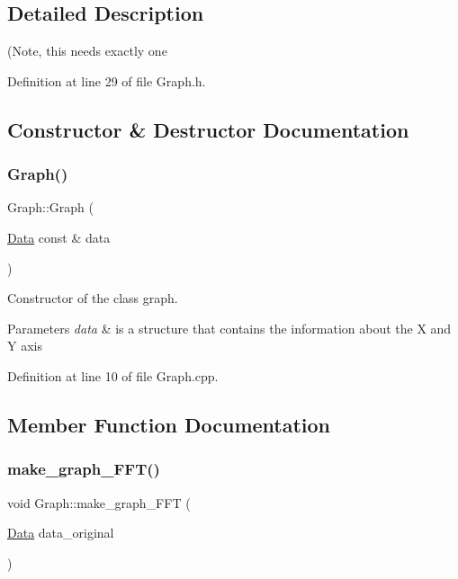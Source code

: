 \subsection{Detailed Description}
(Note, this needs exactly one 

Definition at line 29 of file Graph.\+h.



\subsection{Constructor \& Destructor Documentation}
\mbox{\label{class_graph_ac2cc4f7971589f9674f4fbf3b7dc200c}} 
\subsubsection{\texorpdfstring{Graph()}{Graph()}}
{\footnotesize\ttfamily Graph\+::\+Graph (\begin{DoxyParamCaption}\item[{\mbox{\hyperlink{struct_data}{Data}} const \&}]{data }\end{DoxyParamCaption})\hspace{0.3cm}{\ttfamily [explicit]}}



Constructor of the class graph. 


\begin{DoxyParams}{Parameters}
{\em data} & is a structure that contains the information about the X and Y axis \\
\hline
\end{DoxyParams}


Definition at line 10 of file Graph.\+cpp.



\subsection{Member Function Documentation}
\mbox{\label{class_graph_a5326be30b090c2ba956d0e0211895fcd}} 
\subsubsection{\texorpdfstring{make\+\_\+graph\+\_\+\+F\+F\+T()}{make\_graph\_FFT()}}
{\footnotesize\ttfamily void Graph\+::make\+\_\+graph\+\_\+\+F\+FT (\begin{DoxyParamCaption}\item[{\mbox{\hyperlink{struct_data}{Data}}}]{data\+\_\+original }\end{DoxyParamCaption})}



